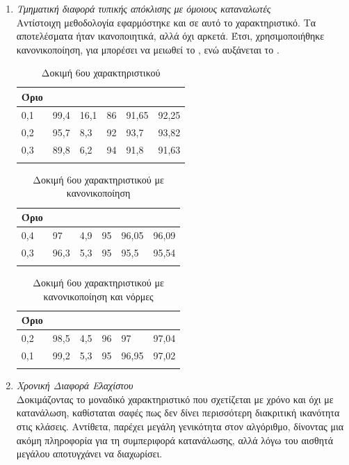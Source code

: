 \begin{enumerate}
\item{\textit{Τμηματική διαφορά τυπικής απόκλισης με όμοιους καταναλωτές}} \\
Αντίστοιχη μεθοδολογία εφαρμόστηκε και σε αυτό το χαρακτηριστικό. Τα αποτελέσματα ήταν ικανοποιητικά, αλλά όχι αρκετά. Έτσι, χρησιμοποιήθηκε κανονικοποίηση, για μπορέσει να μειωθεί το , ενώ αυξάνεται το .
\begin{center}
\begin{longtabu} to 0.8\textwidth { | X[c] || X[c] | X[c] | X[c] | X[c] | X[c] |  }
 \hline
  Όριο &   &  &  &  & \\
 ,1&	99,4&	16,1&	86&	91,65&	92,25\\
0,2&	95,7&	8,3&	92&	93,7&	93,82\\
0,3&	89,8&	6,2&	94&	91,8&	91,63\\
\hline
\caption{Δοκιμή 6ου χαρακτηριστικού}
\label{testfeat6}
\end{longtabu}
\end{center}

\begin{center}
\begin{longtabu} to 0.8\textwidth { | X[c] || X[c] | X[c] | X[c] | X[c] | X[c] |  }
 \hline
  Όριο &   &  &  &  & \\
 ,4&	97&	4,9&	95&	96,05&	96,09\\
0,3	&96,3&	5,3&	95&	95,5&	95,54\\
\hline
\caption{Δοκιμή 6ου χαρακτηριστικού με κανονικοποίηση}
\label{testfeat6normalized}
\end{longtabu}
\end{center}
\begin{center}
\begin{longtabu} to 0.8\textwidth { | X[c] || X[c] | X[c] | X[c] | X[c] | X[c] |  }
 \hline
  Όριο &   &  &  &  & \\
 ,2&	98,5&	4,5&	96&	97&	97,04\\
0,1&	99,2&	5,3&	95&	96,95&	97,02\\
\hline
\caption{Δοκιμή 6ου χαρακτηριστικού με κανονικοποίηση και νόρμες}
\label{testfeat6normalizednorms}
\end{longtabu}
\end{center}

\item{\textit{Χρονική Διαφορά Ελαχίστου}} \\
Δοκιμάζοντας το μοναδικό χαρακτηριστικό που σχετίζεται με χρόνο και όχι με κατανάλωση, καθίσταται σαφές πως δεν δίνει περισσότερη διακριτική ικανότητα στις κλάσεις. Αντίθετα, παρέχει μεγάλη γενικότητα στον αλγόριθμο, δίνοντας μια ακόμη πληροφορία για τη συμπεριφορά κατανάλωσης, αλλά λόγω του αισθητά μεγάλου  αποτυγχάνει να διαχωρίσει.
\end{enumerate}

